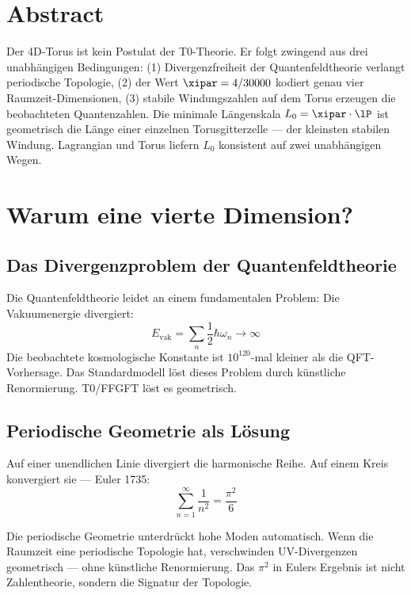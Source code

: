 \section*{Abstract}

Der 4D-Torus ist kein Postulat der T0-Theorie. Er folgt zwingend aus drei unabhängigen Bedingungen: (1) Divergenzfreiheit der Quantenfeldtheorie verlangt periodische Topologie, (2) der Wert $\xipar = 4/30000$ kodiert genau vier Raumzeit-Dimensionen, (3) stabile Windungszahlen auf dem Torus erzeugen die beobachteten Quantenzahlen. Die minimale Längenskala $L_0 = \xipar \cdot \lP$ ist geometrisch die Länge einer einzelnen Torusgitterzelle — der kleinsten stabilen Windung. Lagrangian und Torus liefern $L_0$ konsistent auf zwei unabhängigen Wegen.

\section{Warum eine vierte Dimension?}

\subsection{Das Divergenzproblem der Quantenfeldtheorie}

Die Quantenfeldtheorie leidet an einem fundamentalen Problem: Die Vakuumenergie divergiert:
\begin{equation}
	E_{\text{vak}} = \sum_n \frac{1}{2}\hbar\omega_n \rightarrow \infty
\end{equation}
Die beobachtete kosmologische Konstante ist $10^{120}$-mal kleiner als die QFT-Vorhersage. Das Standardmodell löst dieses Problem durch künstliche Renormierung. T0/FFGFT löst es geometrisch.

\subsection{Periodische Geometrie als Lösung}

Auf einer unendlichen Linie divergiert die harmonische Reihe. Auf einem Kreis konvergiert sie — Euler 1735:
\begin{equation}
	\sum_{n=1}^{\infty} \frac{1}{n^2} = \frac{\pi^2}{6}
\end{equation}

\begin{keypoint}
Die periodische Geometrie unterdrückt hohe Moden automatisch. Wenn die Raumzeit eine periodische Topologie hat, verschwinden UV-Divergenzen geometrisch — ohne künstliche Renormierung. Das $\pi^2$ in Eulers Ergebnis ist nicht Zahlentheorie, sondern die Signatur der Topologie.
\end{keypoint}

